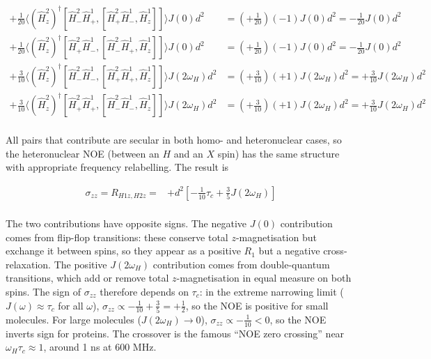 \documentclass[notitlepage,11pt]{article}
\begin{document}
\begin{small}\begin{equation*}\begin{array}{rl} +\frac{1}{20}\langle (\hat{H}^2_z)^{\dagger} [\hat{H}^2_- \hat{H}^1_+ ,[\hat{H}^2_+ \hat{H}^1_- ,\hat{H}^1_z]] \rangle J\left(0\right)d^2 &= ( +\frac{1}{20})( - 1)J\left(0\right) d^2 =  -\frac{1}{20}J\left(0\right) d^2\\

 +\frac{1}{20}\langle (\hat{H}^2_z)^{\dagger} [\hat{H}^2_+ \hat{H}^1_- ,[\hat{H}^2_- \hat{H}^1_+ ,\hat{H}^1_z]] \rangle J\left(0\right)d^2 &= ( +\frac{1}{20})( - 1)J\left(0\right) d^2 =  -\frac{1}{20}J\left(0\right) d^2\\

 +\frac{3}{10}\langle (\hat{H}^2_z)^{\dagger} [\hat{H}^2_- \hat{H}^1_- ,[\hat{H}^2_+ \hat{H}^1_+ ,\hat{H}^1_z]] \rangle J\left(2\omega_H\right)d^2 &= ( +\frac{3}{10})( + 1)J\left(2\omega_H\right) d^2 =  +\frac{3}{10}J\left(2\omega_H\right) d^2\\

 +\frac{3}{10}\langle (\hat{H}^2_z)^{\dagger} [\hat{H}^2_+ \hat{H}^1_+ ,[\hat{H}^2_- \hat{H}^1_- ,\hat{H}^1_z]] \rangle J\left(2\omega_H\right)d^2 &= ( +\frac{3}{10})( + 1)J\left(2\omega_H\right) d^2 =  +\frac{3}{10}J\left(2\omega_H\right) d^2\\

\end{array}\end{equation*}\end{small}

  All pairs that contribute are secular in both homo- and heteronuclear cases, so the heteronuclear NOE (between an $H$ and an $X$ spin) has the same structure with appropriate frequency relabelling. The result is

\begin{small}
\begin{equation}\begin{array}{rl}
\sigma_{zz}= R_{H1z,H2z}=
& + d^2 \left[ -\frac{1}{10} \tau_c +\frac{3}{5} J\left(2\omega_H\right)\right]\\
\end{array}\end{equation}
\end{small}

The two contributions have opposite signs. The negative $J(0)$ contribution comes from flip-flop transitions: these conserve total $z$-magnetisation but exchange it between spins, so they appear as a positive $R_1$ but a negative cross-relaxation. The positive $J(2\omega_H)$ contribution comes from double-quantum transitions, which add or remove total $z$-magnetisation in equal measure on both spins. The sign of $\sigma_{zz}$ therefore depends on $\tau_c$: in the extreme narrowing limit ($J(\omega)\approx\tau_c$ for all $\omega$), $\sigma_{zz}\propto -\tfrac{1}{10}+\tfrac{3}{5}=+\tfrac{1}{2}$, so the NOE is positive for small molecules. For large molecules ($J(2\omega_H)\to 0$), $\sigma_{zz}\propto -\tfrac{1}{10}<0$, so the NOE inverts sign for proteins. The crossover is the famous ``NOE zero crossing'' near $\omega_H\tau_c\approx 1$, around 1 ns at 600 MHz.
\end{document}
